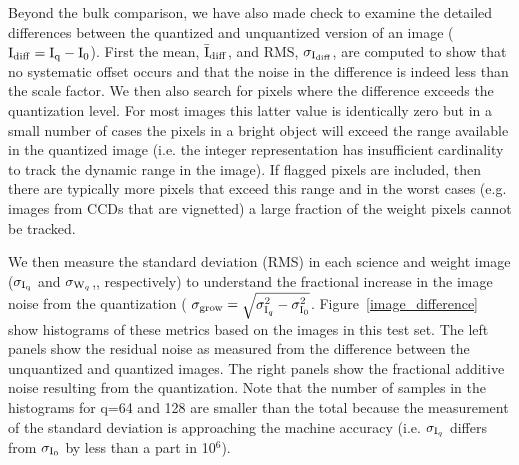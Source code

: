 Beyond the bulk comparison, we have also made check to examine the detailed differences between the 
quantized and unquantized version of an image (${\rm I}_{\rm diff} = {\rm I}_{\rm q}-{\rm I}_{\rm 0}$).  First the mean, 
$\bar{\rm I}_{\rm diff}$, and RMS, $\sigma_{{\rm I}_{\rm diff}}$, are computed to show that no
systematic offset occurs and that the noise in the difference is indeed less than the scale factor.
We then also search for pixels where the difference exceeds the quantization level.  For most images
this latter value is identically zero but in a small number of cases the pixels in a bright object
will exceed the range available in the quantized image (i.e. the integer representation has insufficient
cardinality to track the dynamic range in the image).  If flagged pixels are included, then there 
are typically more pixels that exceed this range and in the worst cases (e.g. images from CCDs that 
are vignetted) a large fraction of the weight pixels cannot be tracked.

We then measure the standard deviation (RMS) in each science and weight image ($\sigma_{{\rm I}_{\rm q}}$ 
and $\sigma_{{\rm W}_{q}}$,, respectively) to understand the fractional increase in the image noise
from the quantization ( $\sigma_{\rm grow} = \sqrt{\sigma_{{\rm I}_{q}}^2 - \sigma_{{\rm I}_{0}}^2 }$.  
Figure~\ref{image_difference} show histograms of these metrics based
on the images in this test set.  The left panels show the residual noise as measured from the difference
between the unquantized and quantized images.  The right panels show the fractional additive noise 
resulting from the quantization.  Note that the number of samples in the histograms for q=64 and 128 
are smaller than the total because the measurement of the standard deviation is approaching the machine 
accuracy (i.e.  $\sigma_{{\rm I}_{q}}$ differs from $\sigma_{{\rm I}_{0}}$ by less than a part in 10$^{6}$).

